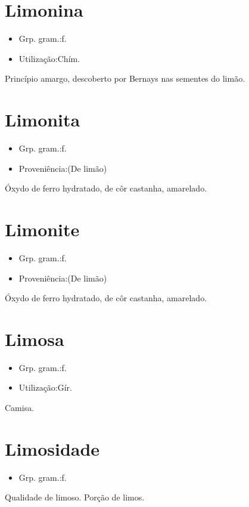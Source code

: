 \section{Limonina}
\begin{itemize}
\item {Grp. gram.:f.}
\end{itemize}
\begin{itemize}
\item {Utilização:Chím.}
\end{itemize}
Princípio amargo, descoberto por Bernays nas sementes do limão.
\section{Limonita}
\begin{itemize}
\item {Grp. gram.:f.}
\end{itemize}
\begin{itemize}
\item {Proveniência:(De \textunderscore limão\textunderscore )}
\end{itemize}
Óxydo de ferro hydratado, de côr castanha, amarelado.
\section{Limonite}
\begin{itemize}
\item {Grp. gram.:f.}
\end{itemize}
\begin{itemize}
\item {Proveniência:(De \textunderscore limão\textunderscore )}
\end{itemize}
Óxydo de ferro hydratado, de côr castanha, amarelado.
\section{Limosa}
\begin{itemize}
\item {Grp. gram.:f.}
\end{itemize}
\begin{itemize}
\item {Utilização:Gír.}
\end{itemize}
Camisa.
\section{Limosidade}
\begin{itemize}
\item {Grp. gram.:f.}
\end{itemize}
Qualidade de limoso.
Porção de limos.
